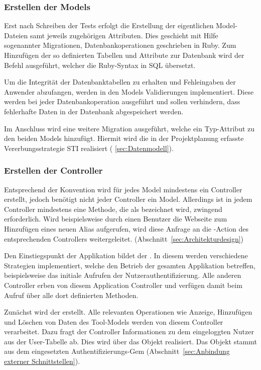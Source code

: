 \subsubsection{Erstellen der Models}
\label{sec:Erstellen der Models}
Erst nach Schreiben der Tests erfolgt die Erstellung der eigentlichen Model-Dateien samt jeweils
zugehörigen Attributen. Dies geschieht mit Hilfe sogenannter Migrationen,
Datenbankoperationen geschrieben in Ruby. Zum Hinzufügen der so definierten Tabellen und Attribute
zur Datenbank wird der Befehl  ausgeführt, welcher die Ruby-Syntax in
\acs{SQL} übersetzt.

Um die Integrität der Datenbanktabellen zu erhalten und \ggfs Fehleingaben der Anwender abzufangen,
werden in den Models Validierungen implementiert. Diese werden bei jeder Datenbankoperation
ausgeführt und sollen verhindern, dass fehlerhafte Daten in der Datenbank abgespeichert werden.


Im Anschluss wird eine weitere Migration ausgeführt, welche ein Typ-Attribut zu den
beiden Models hinzufügt. Hiermit wird die in der
Projektplanung erfasste Vererbungsstrategie \acs{STI} realisiert (\Vgl
\ref{sec:Datenmodell}).

\subsubsection{Erstellen der Controller}
\label{sec:Erstellen der Controller}
Entsprechend der Konvention wird für jedes Model mindestens ein
Controller erstellt, jedoch benötigt nicht jeder Controller ein Model.
Allerdings ist in jedem Controller mindestens eine Methode, die als
 bezeichnet wird, zwingend erforderlich. Wird beispielsweise
durch einen Benutzer die Webseite zum Hinzufügen eines neuen Alias
aufgerufen, wird diese Anfrage an die -Action des
entsprechenden Controllers weitergeleitet.
(\Vgl Abschnitt~\ref{sec:Architekturdesign})

Den Einstiegspunkt der Applikation bildet der . In diesem werden
verschiedene Strategien implementiert, welche den Betrieb der gesamten Applikation betreffen,
beispielsweise das initiale Aufrufen der Nutzerauthentifizierung. Alle anderen Controller erben von diesem
Application Controller und verfügen damit beim Aufruf über alle dort definierten Methoden.

Zunächst wird der  erstellt. Alle relevanten Operationen
wie Anzeige, Hinzufügen und Löschen von Daten des Tool-Models werden von diesem Controller
verarbeitet. Dazu fragt der Controller Informationen zu dem eingeloggten Nutzer aus der User-Tabelle
ab. Dies wird über das Objekt  realisiert. Das Objekt stammt aus dem
eingesetzten Authentifizierungs-Gem  (\Vgl Abschnitt~\ref{sec:Anbindung externer Schnittstellen}).

